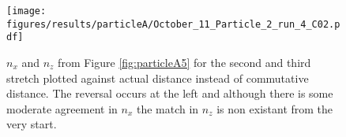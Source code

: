  \begin{figure}[H]
 \centering
 \texttt{[image: figures/results/particleA/October\_11\_Particle\_2\_run\_4\_C02.pdf]}
 \caption{$n_x$ and $n_z$ from Figure \ref{fig:particleA5} for the second and third stretch plotted against actual distance instead of commutative distance. The reversal occurs at the left and although there is some moderate agreement in $n_x$ the match in $n_z$ is non existant from the very start.}
 \label{fig:particleABadReversal}
 \end{figure}

